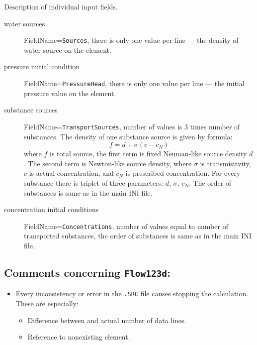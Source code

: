 Description of individual input fields.
\begin{description}
 \item[water sources] FieldName=\verb'Sources', there is only one value per line --- the density of water source on the element.
 \item[pressure initial condition] FieldName=\verb'PressureHead', there is only one value per line --- the initial pressure value on the element.
 \item[substance sources] FieldName=\verb'TransportSources', number of values is 3 times number of substances. The density of one substance source is given by formula:
\[
   f = d + \sigma(c - c_N)
\]
where $f$ is total source, the first term  is fixed Neuman-like source density $d$. The second term is Newton-like source density, where $\sigma$ is transmisitvity, 
$c$ is actual concentration, and $c_N$ is prescribed concentration. For every substance there is triplet of three parameters: $d$, $\sigma$, $c_N$. The order of substances is 
same as in the main INI file.

 \item[concentration initial conditions] FieldName=\verb'Concentrations', number of values equal to number of transported substances, the order of substances is 
same as in the main INI file.
\end{description}

\subsection*{Comments concerning {\tt Flow123d}:}
\begin{itemize}
  \item Every inconsistency or error in the {\tt .SRC} file causes stopping
    the calculation. These are especially:
    \begin{itemize}
      \item Difference between  and actual number
        of data lines.
      \item Reference to nonexisting element.
    \end{itemize}
\end{itemize}
